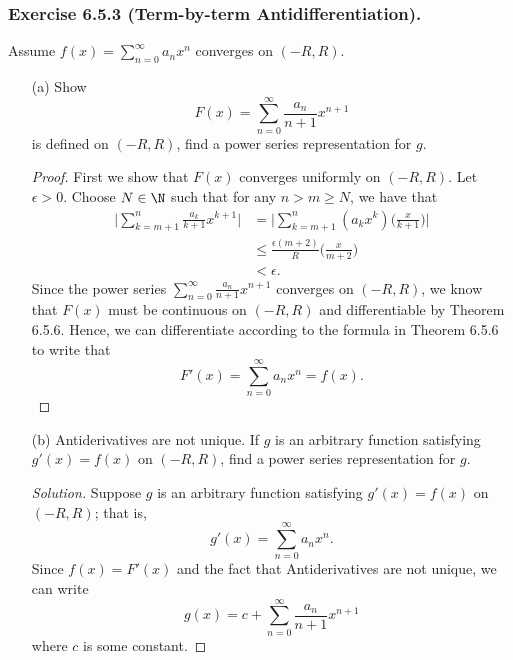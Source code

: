 \subsubsection{Exercise 6.5.3 (Term-by-term Antidifferentiation).} Assume \( f(x) = \sum_{ n=0  }^{  \infty  } a_n x^n  \) converges on \( (-R,R ) \). 
\begin{enumerate}
    \item[(a)] Show 
        \[  F(x) = \sum_{ n=0  }^{ \infty  } \frac{ a_n  }{  n + 1 } x^{n+1} \]
        is defined on \( (-R,R ) \), find a power series representation for \( g  \).
        \begin{proof}
            First we show that \( F(x)  \) converges uniformly on \( (-R,R ) \). Let \( \epsilon > 0   \). Choose \( N \in \N  \) such that for any \(  n > m \geq N  \), we have that 
            \begin{align*}
                \Big| \sum_{ k = m +1  }^{  n } \frac{ a_k  }{  k +1  } x^{k+1} \Big| &= \Big| \sum_{ k= m+1  }^{ n } (a_k x^k) \Big( \frac{ x }{ k+1  }  \Big) \Big|  \\
                                                                                      &\leq \frac{ \epsilon (m+2) }{  R  } \Big( \frac{ x }{ m+2  }  \Big) \\
                                                                                      &< \epsilon \tag{\( x < R  \)}.
            \end{align*}
            Since the power series \( \sum_{ n=0  }^{ \infty  } \frac{ a_n  }{ n + 1  }  x^{n+1}  \) converges on \( (-R,R ) \), we know that \( F(x)  \) must be continuous on \( (-R ,R ) \) and differentiable by Theorem 6.5.6. Hence, we can differentiate according to the formula in Theorem 6.5.6 to write that \[  F'(x) = \sum_{ n=0  }^{ \infty  } a_n x^n = f(x). \]
        \end{proof}
    \item[(b)] Antiderivatives are not unique. If \( g  \) is an arbitrary function satisfying \( g'(x) = f(x)  \) on \( (-R,R ) \), find a power series representation for \( g  \).
        \begin{proof}[Solution]
        Suppose \( g  \) is an arbitrary function satisfying \( g'(x) = f(x)  \) on \( (-R ,R ) \); that is, 
        \[  g'(x) = \sum_{ n=0  }^{ \infty  } a_n x^n. \]
        Since \( f(x) = F'(x)  \) and the fact that Antiderivatives are not unique, we can write 
        \[  g(x) = c +  \sum_{ n=0  }^{ \infty  } \frac{ a_n  }{  n+1  } x^{n+1}\]
        where \( c  \) is some constant.
        \end{proof}
\end{enumerate} 

